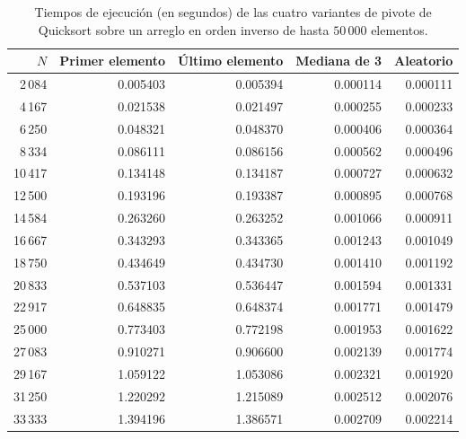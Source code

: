 \begin{table}[!h]
    \centering
    \footnotesize
    \caption{Tiempos de ejecución (en segundos) de las cuatro variantes de pivote de Quicksort sobre un arreglo en orden inverso de hasta $50\,000$ elementos.}
    \label{tab:quicksort_inverse}
    \begin{tabular}{r|rrrr}
        \hline
        $N$     & Primer elemento & Último elemento & Mediana de 3 & Aleatorio \\
        \hline
        2\,084  & 0.005403        & 0.005394        & 0.000114     & 0.000111  \\
        4\,167  & 0.021538        & 0.021497        & 0.000255     & 0.000233  \\
        6\,250  & 0.048321        & 0.048370        & 0.000406     & 0.000364  \\
        8\,334  & 0.086111        & 0.086156        & 0.000562     & 0.000496  \\
        10\,417 & 0.134148        & 0.134187        & 0.000727     & 0.000632  \\
        12\,500 & 0.193196        & 0.193387        & 0.000895     & 0.000768  \\
        14\,584 & 0.263260        & 0.263252        & 0.001066     & 0.000911  \\
        16\,667 & 0.343293        & 0.343365        & 0.001243     & 0.001049  \\
        18\,750 & 0.434649        & 0.434730        & 0.001410     & 0.001192  \\
        20\,833 & 0.537103        & 0.536447        & 0.001594     & 0.001331  \\
        22\,917 & 0.648835        & 0.648374        & 0.001771     & 0.001479  \\
        25\,000 & 0.773403        & 0.772198        & 0.001953     & 0.001622  \\
        27\,083 & 0.910271        & 0.906600        & 0.002139     & 0.001774  \\
        29\,167 & 1.059122        & 1.053086        & 0.002321     & 0.001920  \\
        31\,250 & 1.220292        & 1.215089        & 0.002512     & 0.002076  \\
        33\,333 & 1.394196        & 1.386571        & 0.002709     & 0.002214  \\

\end{tabular}
\end{table}

